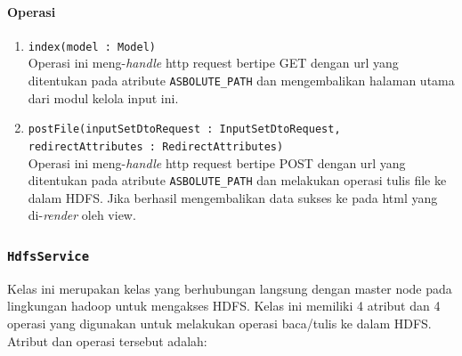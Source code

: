	\paragraph{Operasi}
		\begin{enumerate}
			\item \texttt{index(model : Model)}\\
			Operasi ini meng-\textit{handle} http request bertipe GET dengan url yang ditentukan pada atribute \verb|ASBOLUTE_PATH| dan mengembalikan halaman utama dari modul kelola input ini.
			
			\item \texttt{postFile(inputSetDtoRequest : InputSetDtoRequest,
      redirectAttributes : RedirectAttributes)}\\
			Operasi ini meng-\textit{handle} http request bertipe POST dengan url yang ditentukan pada atribute \verb|ASBOLUTE_PATH| dan melakukan operasi tulis file ke dalam HDFS. Jika berhasil mengembalikan data sukses ke pada html yang di-\textit{render} oleh view.

		\end{enumerate}
		
		

\subsubsection{\texttt{HdfsService}}
		
	Kelas ini merupakan kelas yang berhubungan langsung dengan master node pada lingkungan hadoop untuk mengakses HDFS. Kelas ini memiliki 4 atribut dan 4 operasi yang digunakan untuk melakukan operasi baca/tulis ke dalam HDFS. Atribut dan operasi tersebut adalah:
